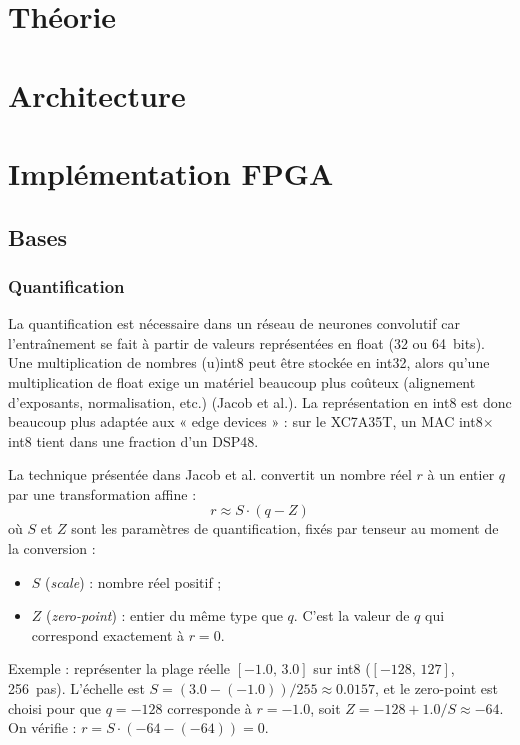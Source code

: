 \documentclass[11pt,a4paper]{article}
\begin{document}
\section{Théorie}

\section{Architecture}

\section{Implémentation FPGA}

\subsection{Bases}

\subsubsection{Quantification}

La quantification est nécessaire dans un réseau de neurones convolutif car
l'entraînement se fait à partir de valeurs représentées en float (32 ou
64~bits). Une multiplication de nombres (u)int8 peut être stockée en int32,
alors qu'une multiplication de float exige un matériel beaucoup plus coûteux
(alignement d'exposants, normalisation, etc.) (Jacob et al.). La
représentation en int8 est donc beaucoup plus adaptée aux « edge devices » :
sur le XC7A35T, un MAC int8$\times$int8 tient dans une fraction d'un DSP48.

La technique présentée dans Jacob et al. convertit un nombre réel $r$ à un
entier $q$ par une transformation affine :
\begin{equation*}
  r \approx S \cdot (q - Z)
\end{equation*}
où $S$ et $Z$ sont les paramètres de quantification, fixés par tenseur au
moment de la conversion :
\begin{itemize}
  \item $S$ (\emph{scale}) : nombre réel positif ;
  \item $Z$ (\emph{zero-point}) : entier du même type que $q$. C'est la
    valeur de $q$ qui correspond exactement à $r = 0$.
\end{itemize}

Exemple : représenter la plage réelle $[-1.0,\, 3.0]$ sur int8
($[-128,\, 127]$, 256~pas). L'échelle est
$S = (3.0 - (-1.0))/255 \approx 0.0157$, et le zero-point est choisi pour que
$q = -128$ corresponde à $r = -1.0$, soit $Z = -128 + 1.0/S \approx -64$.
On vérifie : $r = S \cdot (-64 - (-64)) = 0$.
\end{document}

